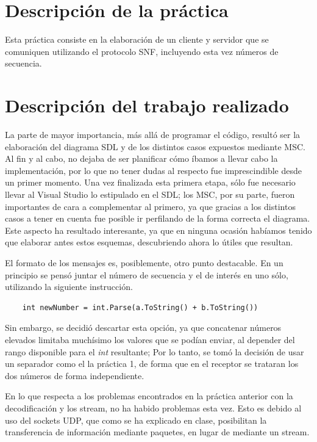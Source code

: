 \documentclass[a4paper,openright,10pt]{article}
\begin{document}
\clearpage

\pagestyle{plain} %


\section {Descripción de la práctica}

Esta práctica consiste en la elaboración de un cliente y servidor que se comuniquen utilizando el protocolo SNF, incluyendo esta vez números de secuencia.

\section{Descripción del trabajo realizado}

La parte de mayor importancia, más allá de programar el código, resultó ser la elaboración del diagrama SDL y de los distintos casos expuestos mediante MSC. Al fin y al cabo, no dejaba de ser planificar cómo íbamos a llevar cabo la implementación, por lo que no tener dudas al respecto fue imprescindible desde un primer momento. Una vez finalizada esta primera etapa, sólo fue necesario llevar al Visual Studio lo estipulado en el SDL; los MSC, por su parte, fueron importantes de cara a complementar al primero, ya que gracias a los distintos casos a tener en cuenta fue posible ir perfilando de la forma correcta el diagrama. Este aspecto ha resultado interesante, ya que en ninguna ocasión habíamos tenido que elaborar antes estos esquemas, descubriendo ahora lo útiles que resultan.

El formato de los mensajes es, posiblemente, otro punto destacable. En un principio se pensó juntar el número de secuencia y el de interés en uno sólo, utilizando la siguiente instrucción.

\begin{verbatim}
	int newNumber = int.Parse(a.ToString() + b.ToString())
\end{verbatim}

Sin embargo, se decidió descartar esta opción, ya que concatenar números elevados limitaba muchísimo los valores que se podían enviar, al depender del rango disponible para el \textit{int} resultante; Por lo tanto, se tomó la decisión de usar un separador como el la práctica 1, de forma que en el receptor se trataran los dos números de forma independiente.

En lo que respecta a los problemas encontrados en la práctica anterior con la decodificación y los stream, no ha habido problemas esta vez. Esto es debido al uso del sockets UDP, que como se ha explicado en clase, posibilitan la transferencia de información mediante paquetes, en lugar de mediante un stream.
\end{document}
